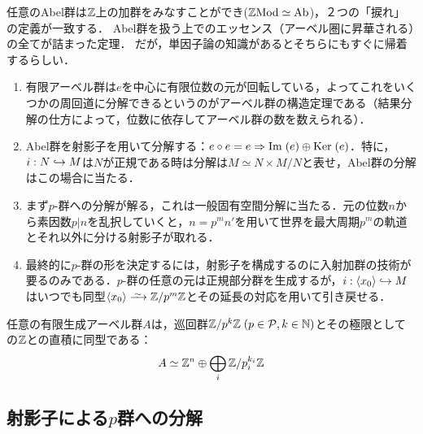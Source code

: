 \documentclass[uplatex,dvipdfmx]{jsreport}
\begin{document}
\begin{tcolorbox}[colframe=ForestGreen, colback=ForestGreen!10!white,breakable,colbacktitle=ForestGreen!40!white,coltitle=black,fonttitle=\bfseries\sffamily,
title=Abel群とAbelian category]
    任意のAbel群は$\mathbb{Z}$上の加群をみなすことができ($\mathbb{Z}\mathrm{Mod}\simeq\mathrm{Ab}$)，２つの「捩れ」の定義が一致する．
    Abel群を扱う上でのエッセンス（アーベル圏に昇華される）の全てが詰まった定理．
    だが，単因子論の知識があるとそちらにもすぐに帰着するらしい．
    \begin{enumerate}
        \item 有限アーベル群は$e$を中心に有限位数の元が回転している，よってこれをいくつかの周回道に分解できるというのがアーベル群の構造定理である（結果分解の仕方によって，位数に依存してアーベル群の数を数えられる）．
        \item Abel群を射影子を用いて分解する：$e\circ e=e\Rightarrow\mathrm{Im}\;(e)\oplus\mathrm{Ker}\;(e)$．特に，$i:N\hookrightarrow M$は$N$が正規である時は分解は$M\simeq N\times M/N$と表せ，Abel群の分解はこの場合に当たる．
        \item まず$p$-群への分解が解る，これは一般固有空間分解に当たる．元の位数$n$から素因数$p|n$を乱択していくと，$n=p^mn'$を用いて世界を最大周期$p^m$の軌道とそれ以外に分ける射影子が取れる．
        \item 最終的に$p$-群の形を決定するには，射影子を構成するのに入射加群の技術が要るのみである．$p$-群の任意の元は正規部分群を生成するが，$i:\langle x_0\rangle\hookrightarrow M$はいつでも同型$\brac{x_0}\iso\Z/p^m\Z$とその延長の対応を用いて引き戻せる．
    \end{enumerate}
\end{tcolorbox}

\begin{theorem}\label{thm-fundamental-theorem-of-finite-abelian-groups}
    任意の有限生成アーベル群$A$は，巡回群$\mathbb{Z}/p^k\mathbb{Z}\;(p\in\mathcal{P},k\in\mathbb{N})$とその極限としての$\mathbb{Z}$との直積に同型である：
    \[A\simeq \mathbb{Z}^n\oplus\bigoplus_i\mathbb{Z}/p_i^{k_i}\mathbb{Z}\]
\end{theorem}

\subsection{射影子による$p$群への分解}
\end{document}

